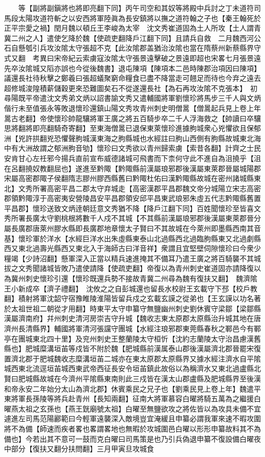 　　等【副將副鎭將也將即亮翻下同】丙午司空和其奴等將殿中兵討之丁未道符司馬段太陽攻道符斬之以安西將軍陸眞為長安鎮將以撫之道符翰之子也【秦王翰死於正平宗愛之禍】閏月魏以頓丘王李峻為太宰　沈文秀崔道固為土人所攻【土人謂青冀二州之人】遣使乞降於魏【使疏吏翻降戶江翻下同】且請兵自救　二月魏西河公石自懸瓠引兵攻汝隂太守張超不克【此汝隂郡盖猶治汝隂也當在隋蔡州新蔡縣界守式又翻　考異曰宋帝紀云索虜寇汝隂太守張景遠擊破之景遠即超也宋畧七月張景遠先卒汝隂城又䧟亦誤也今從後魏書】退屯陳項【陳項本二邑時陳郡治項因曰陳項】議還長社待秋擊之鄭羲曰張超蟻聚窮命糧食已盡不降當走可翹足而待也今弃之遠去超修城浚隍積薪儲穀更來恐難圖矣石不從遂還長社【為石再攻汝隂不克張本】　初尋陽既平帝遣沈文秀弟文炳以詔書諭文秀又遣輔國將軍劉懷珍將馬步三千人與文炳偕行未至值張永等敗退懷珍還鎮山陽文秀攻青州刺史明僧暠【僧暠起兵見上卷上年暠古老翻】帝使懷珍帥龍驤將軍王廣之將五百騎步卒二千人浮海救之【帥讀曰卒驤思將翻將即亮翻騎奇寄翻】至東海僧暠已退保東萊懷珍進據朐城衆心兇懼欲且保郁洲【兇許拱翻兇恐懼聲朐城漢東海之胊縣城也水經註曰胊山西側有朐縣故城東北海中有大洲故謂之郁洲胊音劬】懷珍曰文秀欲以青州歸索虜【索昔各翻】計齊之士民安肯甘心左祍邪今揚兵直前宣布威德諸城可飛書而下柰何守此不進自為沮撓乎【沮在呂翻撓奴教翻屈也】遂進至黔陬【黔陬縣前漢屬琅邪郡後漢屬東萊郡晉屬城陽郡宋屬高密郡陬子侯翻隋志膠州膠西縣舊曰黔陬杜佑曰漢黔陬縣故城在密州諸城縣東北】文秀所署高密平昌二郡太守弃城走【高密漢郡平昌郡魏文帝分城陽立宋志高密郡領黔陬淳于高密夷安營陵昌安平昌郡領安邱平昌東武琅邪朱虛五代志黔陬縣舊置平昌郡】懷珍送致文炳逹朝廷意文秀猶不降【降戶江翻下同】百姓聞懷珍至皆喜文秀所署長廣太守劉桃根將數千人戍不其城【不其縣前漢屬琅邪郡後漢屬東萊郡晉分屬長廣郡唐萊州膠水縣即長廣郡地章懷太子賢曰不其故城在今萊州即墨縣西南其音基】懷珍軍於洋水【水經巨洋水出朱虛縣東泰山北過縣西北過臨朐縣東又北過劇縣西又東北過壽光縣西又東北入于海師古曰洋音祥】衆謂且宜堅壁伺隙懷珍曰今衆少糧竭【少詩沼翻】懸軍深入正當以精兵速進掩其不備耳乃遣王廣之將百騎襲不其城拔之文秀聞諸城皆敗乃遣使請降【使疏吏翻】帝復以為青州刺史崔道固亦請降復以為冀州刺史懷珍引還【懷珍既還兵勢不接故青冀二州尋為魏有復扶又翻】　魏濟隂王小新成卒【濟子禮翻】　沈攸之之自彭城還也留長水校尉王玄載守下邳【校戶教翻】積射將軍沈韶守宿豫睢陵淮陽皆留兵戍之玄載玄謨之從弟也【王玄謨以功名著於太祖世祖二朝從才用翻】時東平太守申纂守無鹽幽州刺史劉休賓守梁鄒【梁鄒縣漢屬濟南府】幷州刺史清河房崇吉守升城【魏收志東太原郡太原縣治升城其地在唐濟州長清縣界】輔國將軍清河張讜守團城【水經注琅邪郡東莞縣春秋之鄆邑今有鄆亭在團城東北四十里】及兖州刺史王整蘭陵太守桓忻【沈約志蘭陵太守治昌慮漢舊縣也】肥城糜溝垣苖等戍皆不附於魏【肥城縣前漢属泰山郡後漢屬濟北郡晉罷宋復置濟北郡于肥城魏收志糜溝垣苖二城亦在東太原郡太原縣界又據水經注濟水自平隂城西東北流逕垣苖城西東武帝西征長安令垣苖鎮此故俗以為稱濟水又東北過盧縣北賢曰肥城縣故城在今濟州平隂縣東南則此三戍皆在漢太山郡盧縣及肥城縣界至後漢和帝永安二年始分太山為濟北郡】休賓乘民之兄子也【劉乘民見上卷上年】魏遣平東將軍長孫陵等將兵赴青州【長知兩翻】征南大將軍慕容白曜將騎五萬為之繼援白曜燕太祖之玄孫也【燕王皝廟號太祖】白曜至無鹽欲攻之將佐皆以為攻具未備不宜遽進左司馬范陽酈範曰今輕軍遠襲深入敵境豈宜淹緩且申纂必謂我軍來速不暇攻圍將不為備【師速而疾者畧也畧謂畧地也無暇於攻城圍邑白曜以形形申纂故料其不為備也】今若出其不意可一鼓而克白曜曰司馬策是也乃引兵偽退申纂不復設備白曜夜中部分【復扶又翻分扶問翻】三月甲寅旦攻城食